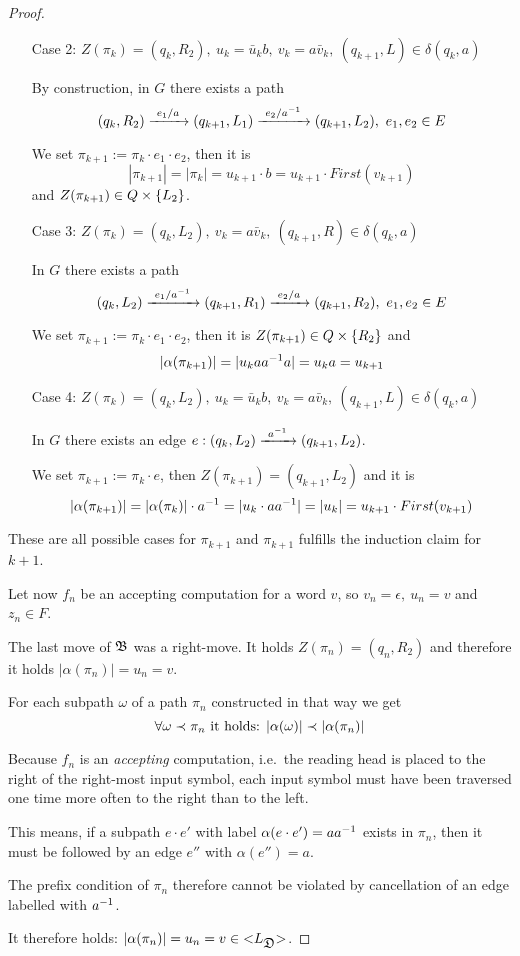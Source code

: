 \begin{proof}
\begin{itemize}
  \item[Case 2:] $Z(\pi_k) = (q_k, R_2),\ u_k = \bar{u}_k b,\ v_k = a
  \bar{v}_k,\ (q_{k+1}, L) \in \delta(q_k, a)$
  
  By construction, in $G$ there exists a path
  \[ (q_k, R_2) \xrightarrow{\ {e_1 / a}\ } (q_{k+1}, L_1) \xrightarrow{\ {e_2 / {{a}^{-1}}}\ } (q_{k+1},
  L_2),\ e_1, e_2 \in E \]
  
  We set $\pi_{k+1} := \pi_k \cdot e_1 \cdot e_2$, then it is
  \[ |\pi_{k+1}| = |\pi_k| = u_{k+1} \cdot b = u_{k+1} \cdot First(v_{k+1}) \]
  and $Z(\pi_{k+1}) \in Q \times \mbox{$\{L_2\}$}$.
  
  \item[Case 3:] $Z(\pi_k) = (q_k, L_2),\ v_k = a \bar{v}_k,\ (q_{k+1}, R) \in
  \delta(q_k, a)$
  
  In $G$ there exists a path 
  \[ (q_k, L_2) \xrightarrow{\ {e_1 / {{a}^{-1}}}\ } (q_{k+1}, R_1) \xrightarrow{\ {e_2 / a}\ } (q_{k+1},
  R_2),\ e_1, e_2 \in E \]
  
  We set $\pi_{k+1} := \pi_k \cdot e_1 \cdot e_2$, then it is $Z(\pi_{k+1}) \in
  Q \times \mbox{$\{R_2\}$}$ and
  \[ |\alpha(\pi_{k+1})| = |u_k a {{a}^{-1}} a| = u_k a = u_{k+1} \]
  
  \item[Case 4:] $Z(\pi_k) = (q_k, L_2),\ u_k = \bar{u}_k b,\ v_k = a
  \bar{v}_k,\ (q_{k+1}, L) \in \delta(q_k, a)$
  
  In $G$ there exists an edge $e: (q_k, L_2) \xrightarrow{\ {{{a}^{-1}}}\ } (q_{k+1}, L_2)$.
  
  We set $\pi_{k+1} := \pi_k \cdot e$, then $Z(\pi_{k+1}) = (q_{k+1}, L_2)$ and
  it is
  \[ |\alpha(\pi_{k+1})| = |\alpha(\pi_k)| \cdot {{a}^{-1}} = |u_k \cdot a {{a}^{-1}}|
  = |u_k| = u_{k+1} \cdot First(v_{k+1}) \]
\end{itemize}

These are all possible cases for $\pi_{k+1}$ and $\pi_{k+1}$ fulfills the
induction claim for $k+1$.

Let now $f_n$ be an accepting computation for a word $v$, so $v_n = \epsilon,\
u_n = v$ and $z_n \in F$.

The last move of $\mbox{$\mathfrak{B}$}$ was a right-move. It holds $Z(\pi_n) = (q_n, R_2)$ and
therefore it holds $|\alpha(\pi_n)| = u_n = v$.

For each subpath $\omega$ of a path $\pi_n$ constructed in that way we get
\[ \forall \omega \prec \pi_n \text{ it holds: }|\alpha(\omega)| \prec
|\alpha(\pi_n)| \]

Because $f_n$ is an {\em accepting} computation, i.e.\ the reading head is
placed to the right of the right-most input symbol, each input symbol must have 
been traversed one time more often to the right than to the left.

This means, if a subpath $e \cdot e'$ with label $\alpha(e \cdot e') = a
{{a}^{-1}}$ exists in $\pi_n$, then it must be followed by an edge $e''$ with
$\alpha(e'') = a$.

The prefix condition of $\pi_n$ therefore cannot be violated by cancellation of
an edge labelled with ${{a}^{-1}}$.

It therefore holds: $|\alpha(\pi_n)| = u_n = v \in \mbox{${<}{L_{\mbox{$\mathfrak{D}$}}}{>}$}$.
\end{proof}

